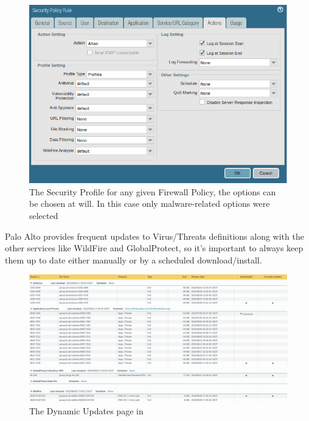\begin{figure}[h!]
 \centering
 \includegraphics[width=13.5cm]{img/policy_security.png}
 \caption{The Security Profile for any given Firewall Policy, the options can be chosen at will. In this case only malware-related options were selected}
 \label{fig: Policy Security Profile}
\end{figure}

Palo Alto provides frequent updates to Virus/Threats definitions along with the other services like WildFire and GlobalProtect, so it's important to always keep them up to date either manually or by a scheduled download/install.

\begin{figure}[h!]
 \centering
 \includegraphics[width=13.5cm]{img/updates.png}
 \caption{The Dynamic Updates page in }
 \label{fig: updates}
\end{figure}



